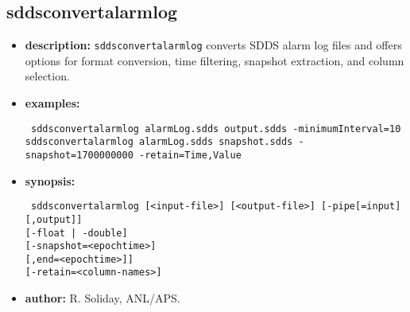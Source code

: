 \newpage
\subsection{sddsconvertalarmlog}
\label{sddsconvertalarmlog}

\begin{itemize}
\item {\bf description:} \verb|sddsconvertalarmlog| converts SDDS alarm log files and offers options for format conversion,
  time filtering, snapshot extraction, and column selection.
\item {\bf examples:}
\begin{flushleft}{\tt
sddsconvertalarmlog alarmLog.sdds output.sdds -minimumInterval=10\\
sddsconvertalarmlog alarmLog.sdds snapshot.sdds -snapshot=1700000000 -retain=Time,Value
}\end{flushleft}
\item {\bf synopsis:}
\begin{flushleft}{\tt
sddsconvertalarmlog [<input-file>] [<output-file>] [-pipe[=input][,output]] \\
[-binary | -ascii] [-float | -double] \\
[-minimumInterval=<seconds>] [-snapshot=<epochtime>] \\
[-time=[start=<epochtime>][,end=<epochtime>]] \\
[-delete=<column-names>] [-retain=<column-names>]
}\end{flushleft}
\item {\bf author:} R. Soliday, ANL/APS.
\end{itemize}
